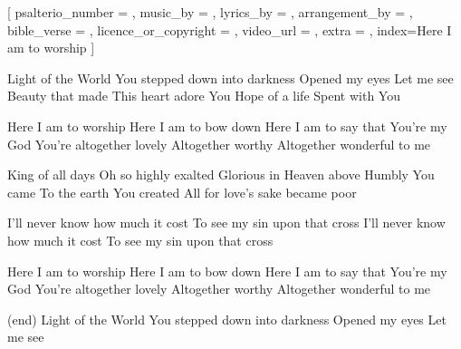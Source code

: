 
\repchoruses

[
	psalterio_number = {},
	music_by = {},    
	lyrics_by = {},
	arrangement_by = {},
	bible_verse  = {},
	licence_or_copyright = {},
	video_url = {},
	extra = {},
	index={Here I am to worship}
]



\beginverse
Light of the World
You stepped down into darkness
Opened my eyes
Let me see
Beauty that made
This heart adore You
Hope of a life
Spent with You
\endverse

\beginchorus
Here I am to worship
Here I am to bow down
Here I am to say that You're my God
You're altogether lovely
Altogether worthy
Altogether wonderful to me
\endchorus

\beginverse
King of all days
Oh so highly exalted
Glorious in Heaven above
Humbly You came
To the earth You created
All for love's sake became poor
\endverse                         

\beginverse*
I'll never know how much it cost
To see my sin upon that cross
I'll never know how much it cost
To see my sin upon that cross \linebreak
\endverse   

\beginchorus
Here I am to worship
Here I am to bow down
Here I am to say that You're my God
You're altogether lovely
Altogether worthy
Altogether wonderful to me
\endchorus


\beginverse*
(end)
Light of the World
You stepped down into darkness
Opened my eyes
Let me see
\endverse   


\norepchoruses

\endsong
